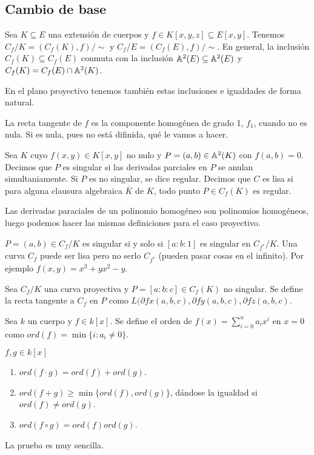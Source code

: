 \documentclass[CR.tex]{subfiles}
\begin{document}
\subsection{Cambio de base}
Sea $K\subseteq E$ una extensión de cuerpos y $f\in K[x,y,z]\subseteq E[x,y]$. Tenemos $C_f/K=(C_f(K),f)/\sim$ y $C_f/E=(C_f(E),f)/\sim$. En general, la inclusión $C_f(K)\subseteq C_f(E)$ conmuta con la inclusión $\mathbb{A}^2(E)\subseteq \mathbb{A}^2(E)$ y $C_f(K)=C_f(E)\cap \mathbb{A}^2(K)$. 

En el plano proyectivo tenemos también estas inclusiones e igualdades de forma natural. 

\begin{defi}
La recta tangente de $f$ es la componente homogénea de grado 1, $f_1$, cuando no es nula. Si es nula, pues no está difinida, qué le vamos a hacer.
\end{defi}


\begin{defi}[2.2.7]
Sea $K$ cuyo $f(x,y)\in K[x,y]$ no nulo y $P=(a,b)\in \mathbb{A}^2(K)$ con $f(a,b)=0$. Decimos que $P$ es singular si las derivadas parciales en $P$ se anulan simultaniamente. Si $P$ es no singular, se dice regular. Decimos que $C$ es lisa si para alguna clausura algebraica $\overline{K}$ de $K$, todo punto $P\in C_f(K)$ es regular. 
\end{defi}

Las derivadas paraciales de un polinomio homogéneo son polinomios homogéneos, luego podemos hacer las mismas definiciones para el caso proyectivo.

\begin{nota}
$P=(a,b)\in C_f/K$ es singular si y solo si $[a:b:1]$ es singular en $C_{f^*}/K$. Una curva $C_f$ puede ser lisa pero no serlo $C_{f^*}$ (pueden pasar cosas en el infinito). Por ejemplo $f(x,y)=x^3+yx^2-y$.
\end{nota}
\begin{defi}
Sea $C_f/K$ una curva proyectiva y $P=[a:b:c]\in C_f(K)$ no singular. Se define la recta tangente a $C_f$ en $P$ como $L(\partial{f}{x}(a,b,c),\partial{f}{y}(a,b,c),\partial{f}{z}(a,b,c)$. 
\end{defi}
\begin{defi}
Sea $k$ un cuerpo y $f\in k[x]$. Se define el orden de $f(x)=\sum_{i=0}^na_ix^i$ en $x=0$ como $ord(f)=\min\{i:a_i\neq 0\}$. 
\end{defi}

\begin{lemma}
$f,g\in k[x]$
\begin{enumerate}
\item $ord(f\cdot g)=ord(f)+ord(g)$.
\item $ord(f+g)\geq\min\{ord(f),ord(g)\}$, dándose la igualdad si $ord(f)\neq ord(g)$.
\item $ord(f\circ g)=ord(f)ord(g)$. 
\end{enumerate}
\end{lemma}
La prueba es muy sencilla.
\end{document}
